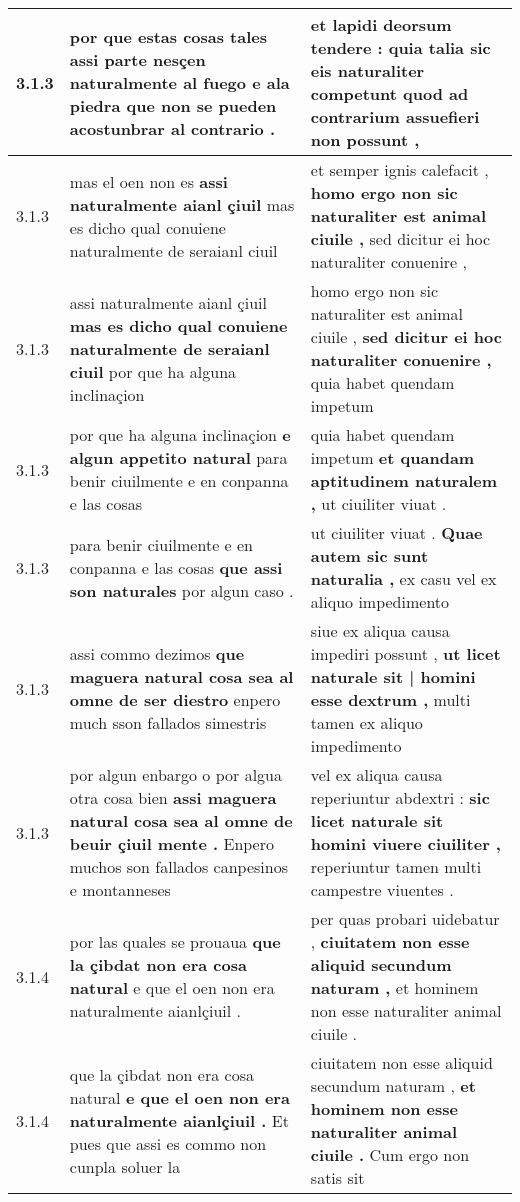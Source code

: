 \begin{tabular}{|p{1cm}|p{6.5cm}|p{6.5cm}|}
3.1.3 & por que estas cosas tales \textbf{ assi parte nesçen naturalmente al fuego e ala piedra } que non se pueden acostunbrar al contrario . & et lapidi deorsum tendere : \textbf{ quia talia sic eis naturaliter competunt } quod ad contrarium assuefieri non possunt , \\\hline
3.1.3 & mas el oen non es \textbf{ assi naturalmente aianl çiuil } mas es dicho qual conuiene naturalmente de seraianl ciuil & et semper ignis calefacit , \textbf{ homo ergo non sic naturaliter est animal ciuile , } sed dicitur ei hoc naturaliter conuenire , \\\hline
3.1.3 & assi naturalmente aianl çiuil \textbf{ mas es dicho qual conuiene naturalmente de seraianl ciuil } por que ha alguna inclinaçion & homo ergo non sic naturaliter est animal ciuile , \textbf{ sed dicitur ei hoc naturaliter conuenire , } quia habet quendam impetum \\\hline
3.1.3 & por que ha alguna inclinaçion \textbf{ e algun appetito natural } para benir ciuilmente e en conpanna e las cosas & quia habet quendam impetum \textbf{ et quandam aptitudinem naturalem , } ut ciuiliter viuat . \\\hline
3.1.3 & para benir ciuilmente e en conpanna e las cosas \textbf{ que assi son naturales } por algun caso . & ut ciuiliter viuat . \textbf{ Quae autem sic sunt naturalia , } ex casu vel ex aliquo impedimento \\\hline
3.1.3 & assi commo dezimos \textbf{ que maguera natural cosa sea al omne de ser diestro } enpero much sson fallados simestris & siue ex aliqua causa impediri possunt , \textbf{ ut licet naturale sit | homini esse dextrum , } multi tamen ex aliquo impedimento \\\hline
3.1.3 & por algun enbargo o por algua otra cosa bien \textbf{ assi maguera natural cosa sea al omne de beuir çiuil mente . } Enpero muchos son fallados canpesinos e montanneses & vel ex aliqua causa reperiuntur abdextri : \textbf{ sic licet naturale sit homini viuere ciuiliter , } reperiuntur tamen multi campestre viuentes . \\\hline
3.1.4 & por las quales se prouaua \textbf{ que la çibdat non era cosa natural } e que el oen non era naturalmente aianlçiuil . & per quas probari uidebatur , \textbf{ ciuitatem non esse aliquid secundum naturam , } et hominem non esse naturaliter animal ciuile . \\\hline
3.1.4 & que la çibdat non era cosa natural \textbf{ e que el oen non era naturalmente aianlçiuil . } Et pues que assi es commo non cunpla soluer la & ciuitatem non esse aliquid secundum naturam , \textbf{ et hominem non esse naturaliter animal ciuile . } Cum ergo non satis sit \\\hline

\end{tabular}
